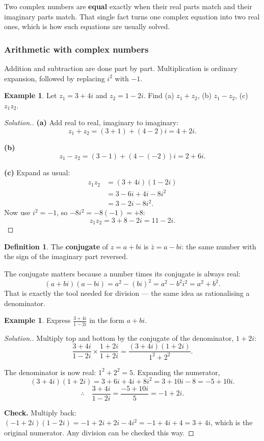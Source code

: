 \documentclass[11pt,a4paper]{article}
\theoremstyle{definition}
\newtheorem{definition}[thm]{Definition}
\newtheorem{example}[thm]{Example}
\newenvironment{solution}
  {\renewcommand{\qedsymbol}{}\begin{proof}[\textit{Solution}.]}
  {\end{proof}}
\begin{document}
Two complex numbers are \textbf{equal} exactly when their real parts match and their
imaginary parts match. That single fact turns one complex equation into two real ones,
which is how such equations are usually solved.

\subsubsection{Arithmetic with complex numbers}

Addition and subtraction are done part by part. Multiplication is ordinary expansion,
followed by replacing $i^2$ with $-1$.

\begin{example}
Let $z_1=3+4i$ and $z_2=1-2i$. Find (a) $z_1+z_2$, (b) $z_1-z_2$, (c) $z_1z_2$.
\end{example}

\begin{solution}
\textbf{(a)} Add real to real, imaginary to imaginary:
$$z_1+z_2=(3+1)+(4-2)i=4+2i.$$

\textbf{(b)} $$z_1-z_2=(3-1)+(4-(-2))i=2+6i.$$

\textbf{(c)} Expand as usual:
\begin{align*}
z_1z_2 &=(3+4i)(1-2i)\\
       &=3-6i+4i-8i^2\\
       &=3-2i-8i^2.
\end{align*}
Now use $i^2=-1$, so $-8i^2=-8(-1)=+8$:
$$z_1z_2=3+8-2i=11-2i.$$
\end{solution}

\begin{definition}
The \textbf{conjugate} of $z=a+bi$ is $\bar{z}=a-bi$: the same number with the sign of
the imaginary part reversed.
\end{definition}

The conjugate matters because a number times its conjugate is always real:
$$(a+bi)(a-bi)=a^2-(bi)^2=a^2-b^2i^2=a^2+b^2.$$
That is exactly the tool needed for division --- the same idea as rationalising a
denominator.

\begin{example}
Express $\frac{3+4i}{1-2i}$ in the form $a+bi$.
\end{example}

\begin{solution}
Multiply top and bottom by the conjugate of the denominator, $1+2i$:
$$\frac{3+4i}{1-2i}\times\frac{1+2i}{1+2i}=\frac{(3+4i)(1+2i)}{1^2+2^2}.$$

The denominator is now real: $1^2+2^2=5$. Expanding the numerator,
$$(3+4i)(1+2i)=3+6i+4i+8i^2=3+10i-8=-5+10i.$$
$$\therefore\quad \frac{3+4i}{1-2i}=\frac{-5+10i}{5}=-1+2i.$$

\textbf{Check.} Multiply back: $(-1+2i)(1-2i)=-1+2i+2i-4i^2=-1+4i+4=3+4i$, which is
the original numerator. Any division can be checked this way.
\end{solution}
\end{document}

